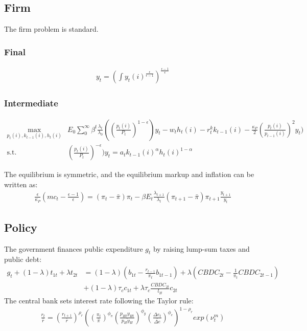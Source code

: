 \documentclass[12pt]{article}
\begin{document}
\subsection{Firm}
The firm problem is standard. 

\subsubsection*{Final}
\begin{align*}
y_t = (\int y_t(i)^{\frac{\epsilon}{\epsilon-1}})^{\frac{\epsilon-1}{\epsilon}}
\end{align*}

\subsubsection*{Intermediate}
\begin{align*}
\max_{p_t(i),k_{t-1}(i), h_t(i)} &E_0 \sum_0^{\infty}\beta^t\frac{\lambda_t}{\lambda_0}((\frac{p_t(i)}{P_t})^{1-\epsilon})y_t-w_th_t(i)-r_t^kk_{t-1}(i)-\frac{\kappa_P}{2}(\frac{p_t(i)}{p_{t-1}(i)})^2y_t) \\
\text{s.t.} \quad & (\frac{p_t(i)}{P_t})^{-\epsilon})y_t = a_tk_{t-1}(i)^{\alpha}h_t(i)^{1-\alpha}
\end{align*}

The equilibrium is symmetric, and the equilibrium markup and inflation can be written as:
\begin{align*}
\frac{\epsilon}{\kappa_P}(mc_t-\frac{\epsilon-1}{\epsilon}) = (\pi_t-\bar{\pi})\pi_t-\beta E_t \frac{\lambda_{t+1}}{\lambda_{t}} (\pi_{t+1}-\bar{\pi})\pi_{t+1}\frac{y_{t+1}}{y_t}
\end{align*}

\subsection{Policy}
The government finances public expenditure $g_t$ by raising lump-sum taxes and public debt:
\begin{align*}
g_t + (1-\lambda)t_{1t}+\lambda t_{2t} &= (1-\lambda)(b_{1t}-\frac{r_{t-1}}{\pi_t}b_{1t-1})+\lambda(CBDC_{2t}-\frac{1}{\pi_t} CBDC_{2t-1} ) \\
& + (1-\lambda)\tau_c c_{1t} +\lambda\tau_c\frac{CBDC_{2t}}{l_{2t}}c_{2t}
\end{align*}
The central bank sets interest rate following the Taylor rule: 
\begin{align*}
\frac{r_t}{\bar{r}} = (\frac{r_{t+1}}{\bar{r}})^{\rho_r}((\frac{\pi_t}{\bar{\pi}} )^{\phi_{\pi}} (\frac{p_{Ht}y_{Ht}}{\bar{p_Hy_H}})^{\phi_y} (\frac{\Delta e_t}{\bar{\Delta e}})^{\phi_e})^{1-\rho_r}exp(\nu_t^m)
\end{align*}
\end{document}
